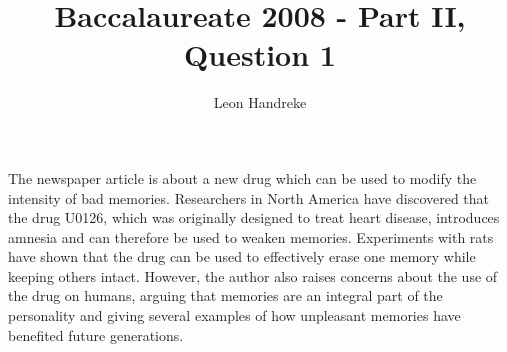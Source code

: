 \documentclass[11pt]{article}
\title{Baccalaureate 2008 - Part II, Question 1}
\author{Leon Handreke}
\date{}                                           %
\begin{document}
\doublespacing

\maketitle
{}\selectfont

The newspaper article is about a new drug which can be used to modify the intensity of bad memories. Researchers in North America have discovered that the drug U0126, which was originally designed to treat heart disease, introduces amnesia and can therefore be used to weaken memories. Experiments with rats have shown that the drug can be used to effectively erase one memory while keeping others intact. However, the author also raises concerns about the use of the drug on humans, arguing that memories are an integral part of the personality and giving several examples of how unpleasant memories have benefited future generations.
\end{document}
